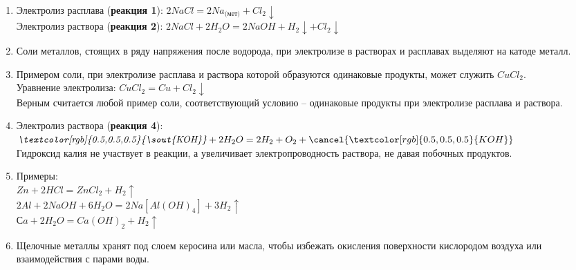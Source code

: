 \solutionSection
\begin{enumerate}
    \item Электролиз расплава (\textbf{реакция 1}): $2NaCl = 2Na_\text{(мет)} + Cl_2\downarrow$\\
    Электролиз раствора (\textbf{реакция 2}): $2NaCl + 2H_2O = 2NaOH + H_2\downarrow + Cl_2\downarrow$
    \item Соли металлов, стоящих в ряду напряжения после водорода, при электролизе в растворах и  расплавах выделяют на катоде металл.
    \item Примером соли, при электролизе расплава и раствора которой образуются одинаковые продукты, может служить $CuCl_2$.\\
    Уравнение электролиза: $CuCl_2 = Cu + Cl_2\downarrow$\\
    Верным считается любой пример соли, соответствующий условию – одинаковые продукты при электролизе расплава и раствора.
    \item Электролиз раствора (\textbf{реакция 4}): $\textit{\textcolor[rgb]{0.5,0.5,0.5}{\sout{KOH}}} + 2H_2O = 2H_2 + O_2 +\cancel{\textcolor[rgb]{0.5,0.5,0.5}{KOH}}$\\
    Гидроксид калия не участвует в реакции, а увеличивает электропроводность раствора, не давая побочных продуктов.
    \item Примеры:\\
    $Zn + 2HCl = ZnCl_2 + H_2 \uparrow$\\
    $2Al +2NaOH + 6H_2O= 2Na[Al(OH)_4] + 3H_2\uparrow$\\
    $Сa + 2H_2O = Ca(OH)_2 + H_2\uparrow$
    \item Щелочные металлы хранят под слоем керосина или масла, чтобы избежать окисления поверхности кислородом воздуха или взаимодействия с парами воды.
\end{enumerate}